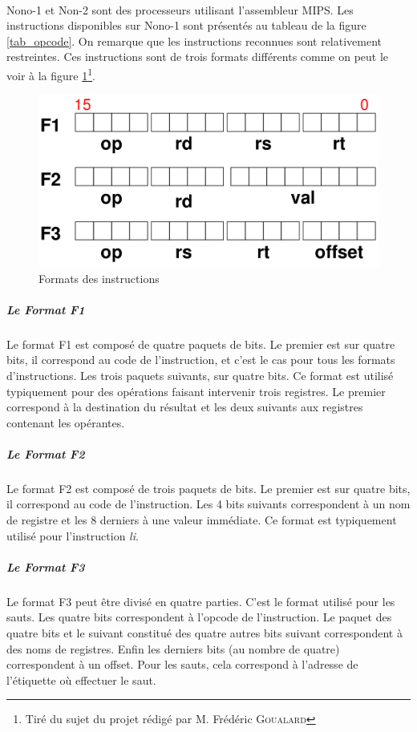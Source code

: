 \documentclass[a4paper]{article}
\begin{document}
			\paragraph{}{
			Nono-1 et Non-2 sont des processeurs utilisant l'assembleur MIPS. Les 
			instructions disponibles sur Nono-1 sont présentés au tableau de la figure
			\ref{tab_opcode}. On remarque que les instructions reconnues sont relativement
			restreintes. Ces instructions sont de trois formats différents comme on peut
			le voir à la figure \ref{format_inst}\footnote{Tiré du sujet du projet rédigé par M. Frédéric \textsc{Goualard}}.
			}
			
			\begin{figure}[!ht]
			\centering
			\includegraphics[scale=0.2]{formats_instructions.png}
			\caption{\label{format_inst} Formats des instructions}
			\end{figure}
			
				\subparagraph{Le Format F1}{
				Le format F1 est composé de quatre paquets de bits.
				Le premier est sur quatre bits, il correspond au code de l'instruction,
				et c'est le cas pour tous les formats d'instructions.
				Les trois paquets suivants, sur quatre bits. Ce format est utilisé typiquement
				pour des opérations faisant intervenir trois registres. Le premier correspond
				à la destination du résultat et les deux suivants aux registres contenant les
				opérantes.
				}
				\subparagraph{Le Format F2}{
				Le format F2 est composé de trois paquets de bits.
				Le premier est sur quatre bits, il correspond au code de l'instruction.
				Les 4 bits suivants correspondent à un nom de registre et les 8 derniers
				à une valeur immédiate. Ce format est typiquement utilisé pour l'instruction
				\textit{li}.
				}
				\subparagraph{Le Format F3}{
				Le format F3 peut être divisé en quatre parties. C'est le format utilisé
				pour les sauts. Les quatre bits correspondent à l'opcode de l'instruction.
				Le paquet des quatre bits et le suivant constitué des quatre autres bits
				suivant correspondent à des noms de registres. Enfin les derniers bits (au
				nombre de quatre) correspondent à un offset. Pour les sauts, cela correspond
				à l'adresse de l'étiquette où effectuer le saut. 
				}
			
\end{document}
